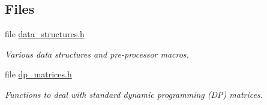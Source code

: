 \subsection*{Files}
\begin{DoxyCompactItemize}
\item 
file \hyperlink{data__structures_8h}{data\+\_\+structures.\+h}
\begin{DoxyCompactList}\small\item\em Various data structures and pre-\/processor macros. \end{DoxyCompactList}\item 
file \hyperlink{dp__matrices_8h}{dp\+\_\+matrices.\+h}
\begin{DoxyCompactList}\small\item\em Functions to deal with standard dynamic programming (DP) matrices. \end{DoxyCompactList}\end{DoxyCompactItemize}
